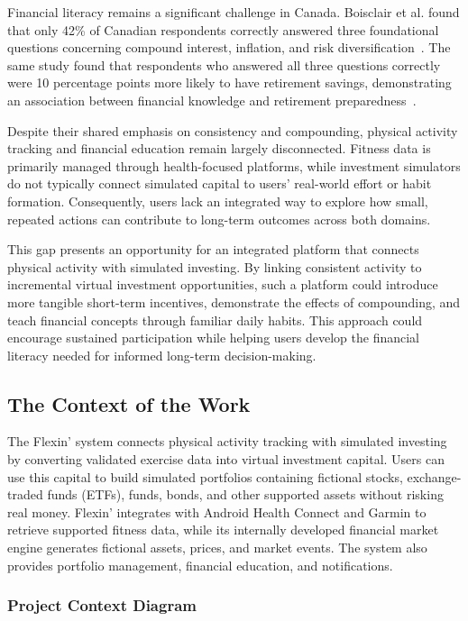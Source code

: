\documentclass[12pt]{article}
\begin{document}
Financial literacy remains a significant challenge in Canada.
Boisclair et al. found that only 42\% of Canadian respondents correctly
answered three foundational questions concerning compound interest,
inflation, and risk diversification~\cite{boisclair2017}.
The same study found that respondents who answered all three questions
correctly were 10 percentage points more likely to have retirement
savings, demonstrating an association between financial knowledge and
retirement preparedness~\cite{boisclair2017}.

Despite their shared emphasis on consistency and compounding, physical
activity tracking and financial education remain largely disconnected.
Fitness data is primarily managed through health-focused platforms,
while investment simulators do not typically connect simulated capital
to users' real-world effort or habit formation. Consequently, users
lack an integrated way to explore how small, repeated actions can
contribute to long-term outcomes across both domains.

This gap presents an opportunity for an integrated platform that
connects physical activity with simulated investing. By linking
consistent activity to incremental virtual investment opportunities,
such a platform could introduce more tangible short-term incentives,
demonstrate the effects of compounding, and teach financial concepts
through familiar daily habits. This approach could encourage sustained
participation while helping users develop the financial literacy
needed for informed long-term decision-making.


\subsection{The Context of the Work}

The Flexin' system connects physical activity tracking with simulated
investing by converting validated exercise data into virtual investment
capital. Users can use this capital to build simulated portfolios
containing fictional stocks, exchange-traded funds (ETFs), funds, bonds,
and other supported assets without risking real money. Flexin' integrates
with Android Health Connect and Garmin to retrieve supported fitness
data, while its internally developed financial market engine generates
fictional assets, prices, and market events. The system also provides
portfolio management, financial education, and notifications.

\subsubsection{Project Context Diagram}
\end{document}
